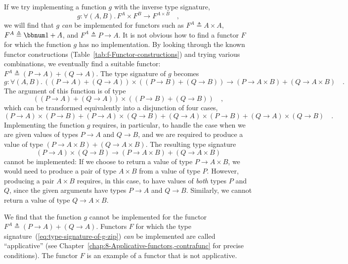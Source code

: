 If we try implementing a function $g$ with the inverse type signature,
\begin{equation}
g:\forall(A,B).\,F^{A}\times F^{B}\rightarrow F^{A\times B}\quad,\label{eq:type-signature-of-g-zip}
\end{equation}
we will find that $g$ \emph{can} be implemented for functors such
as $F^{A}\triangleq A\times A$, $F^{A}\triangleq\bbnum 1+A$, and
$F^{A}\triangleq P\rightarrow A$. It is not obvious how to find a
functor $F$ for which the function $g$ has no implementation. By
looking through the known functor constructions (Table~\ref{tab:f-Functor-constructions})
and trying various combinations, we eventually find a suitable functor:
$F^{A}\triangleq(P\rightarrow A)+(Q\rightarrow A)$. The type signature
of $g$ becomes
\[
g:\forall(A,B).\,\left((P\rightarrow A)+(Q\rightarrow A)\right)\times\left((P\rightarrow B)+(Q\rightarrow B)\right)\rightarrow(P\rightarrow A\times B)+(Q\rightarrow A\times B)\quad.
\]
The argument of this function is of type
\[
\left((P\rightarrow A)+(Q\rightarrow A)\right)\times\left((P\rightarrow B)+(Q\rightarrow B)\right)\quad,
\]
which can be transformed equivalently into a disjunction of four cases,
\[
(P\rightarrow A)\times(P\rightarrow B)+(P\rightarrow A)\times(Q\rightarrow B)+(Q\rightarrow A)\times(P\rightarrow B)+(Q\rightarrow A)\times(Q\rightarrow B)\quad.
\]
Implementing the function $g$ requires, in particular, to handle
the case when we are given values of types $P\rightarrow A$ and $Q\rightarrow B$,
and we are required to produce a value of type $(P\rightarrow A\times B)+(Q\rightarrow A\times B)$.
The resulting type signature
\[
(P\rightarrow A)\times(Q\rightarrow B)\rightarrow(P\rightarrow A\times B)+(Q\rightarrow A\times B)
\]
cannot be implemented: If we choose to return a value of type $P\rightarrow A\times B$,
we would need to produce a pair of type $A\times B$ from a value
of type $P$. However, producing a pair $A\times B$ requires, in
this case, to have values of \emph{both} types $P$ and $Q$, since
the given arguments have types $P\rightarrow A$ and $Q\rightarrow B$.
Similarly, we cannot return a value of type $Q\rightarrow A\times B$.

We find that the function $g$ cannot be implemented for the functor
$F^{A}\triangleq(P\rightarrow A)+(Q\rightarrow A)$. Functors $F$
for which the type signature~(\ref{eq:type-signature-of-g-zip})
\emph{can} be implemented are called ``applicative''
(see Chapter~\ref{chap:8-Applicative-functors,-contrafunc} for precise
conditions). The functor $F$ is an example of a functor that is not
applicative.

